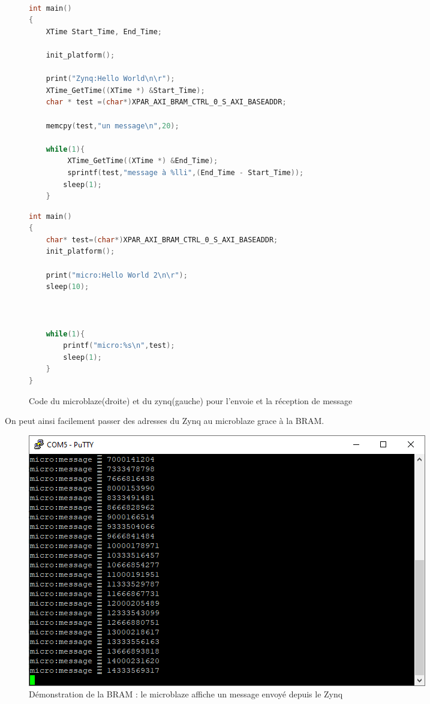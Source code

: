 \documentclass[12pt,a4paper]{ieee}
\begin{document}
\begin{figure}[H]
\begin{multicols}{2}
		\begin{lstlisting}[language=C]
		
int main()
{
	XTime Start_Time, End_Time;

    init_platform();

    print("Zynq:Hello World\n\r");
    XTime_GetTime((XTime *) &Start_Time);
    char * test =(char*)XPAR_AXI_BRAM_CTRL_0_S_AXI_BASEADDR;

    memcpy(test,"un message\n",20);

    while(1){
    	 XTime_GetTime((XTime *) &End_Time);
    	 sprintf(test,"message à %lli",(End_Time - Start_Time));
    	sleep(1);
    }
	\end{lstlisting}	
	 \bigskip
			\begin{lstlisting}[language=C]
int main()
{
	char* test=(char*)XPAR_AXI_BRAM_CTRL_0_S_AXI_BASEADDR;
    init_platform();

    print("micro:Hello World 2\n\r");
	sleep(10);
    
    
    
    while(1){
    	printf("micro:%s\n",test);
    	sleep(1);
    }
}

	\end{lstlisting}	
\end{multicols}		
	\caption{Code du microblaze(droite) et du zynq(gauche) pour l'envoie et la réception de message}
	\label{fig-hls}
\end{figure}
On peut ainsi facilement passer des adresses du Zynq au microblaze grace à la BRAM.
\begin{figure}[H]
	\centering
		\includegraphics[width=\linewidth]{im/bram2.png}	
	\caption{Démonstration de la BRAM : le microblaze affiche un message envoyé depuis le Zynq}
	\label{fig-bram2}
\end{figure}
\end{document}
